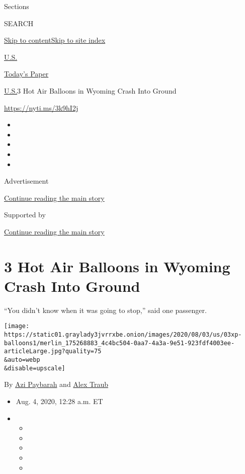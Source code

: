Sections

SEARCH

\protect\hyperlink{site-content}{Skip to
content}\protect\hyperlink{site-index}{Skip to site index}

\href{https://www.nytimes3xbfgragh.onion/section/us}{U.S.}

\href{https://myaccount.nytimes3xbfgragh.onion/auth/login?response_type=cookie\&client_id=vi}{}

\href{https://www.nytimes3xbfgragh.onion/section/todayspaper}{Today's
Paper}

\href{/section/us}{U.S.}\textbar{}3 Hot Air Balloons in Wyoming Crash
Into Ground

\url{https://nyti.ms/3k9hI2j}

\begin{itemize}
\item
\item
\item
\item
\item
\end{itemize}

Advertisement

\protect\hyperlink{after-top}{Continue reading the main story}

Supported by

\protect\hyperlink{after-sponsor}{Continue reading the main story}

\hypertarget{3-hot-air-balloons-in-wyoming-crash-into-ground}{%
\section{3 Hot Air Balloons in Wyoming Crash Into
Ground}\label{3-hot-air-balloons-in-wyoming-crash-into-ground}}

``You didn't know when it was going to stop,'' said one passenger.

\texttt{[image: https://static01.graylady3jvrrxbe.onion/images/2020/08/03/us/03xp-balloons1/merlin\_175268883\_4c4bc504-0aa7-4a3a-9e51-923fdf4003ee-articleLarge.jpg?quality=75\\\&auto=webp\\\&disable=upscale]}

By \href{https://www.nytimes3xbfgragh.onion/by/azi-paybarah}{Azi
Paybarah} and
\href{https://www.nytimes3xbfgragh.onion/by/alex-traub}{Alex Traub}

\begin{itemize}
\item
  Aug. 4, 2020, 12:28 a.m. ET
\item
  \begin{itemize}
  \item
  \item
  \item
  \item
  \item
  \end{itemize}
\end{itemize}

